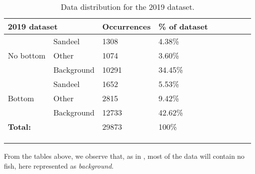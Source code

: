 \begin{longtable}{lllllllll}
\caption[2019 data distribution]{Data distribution for the 2019 dataset.}
\\ \cline{1-4}
\multicolumn{2}{|l|}{\textbf{2019 dataset}} & \multicolumn{1}{l|}{Occurrences} & \multicolumn{1}{l|}{\% of dataset} &  &  &  &  &  \\ \cline{1-4}
\endfirsthead
%
\endhead
%
                     & Sandeel              & 1308                             & 4.38\%                             &  &  &  &  &  \\
No bottom            & Other                & 1074                             & 3.60\%                             &  &  &  &  &  \\
                     & Background           & 10291                            & 34.45\%                            &  &  &  &  &  \\ \cline{1-4}
                     & Sandeel              & 1652                             & 5.53\%                             &  &  &  &  &  \\
Bottom               & Other                & 2815                             & 9.42\%                             &  &  &  &  &  \\
                     & Background           & 12733                            & 42.62\%                            &  &  &  &  &  \\ \cline{1-4}
\multicolumn{2}{l}{\textbf{Total:}}         & 29873                            & 100\%                              &  &  &  &  &  \\ \cline{1-4}
                     &                      &                                  &                                    &  &  &  &  &  \\
                     &                      &                                  &                                    &  &  &  &  & 
\\ \label{data_distribution_2019_table}
\end{longtable}  

        From the tables above, we observe that, as in \citeauthor{brautaset2020acoustic} \cite{brautaset2020acoustic}, most of the data will contain no fish, here represented as \textit{background}.

\clearpage
